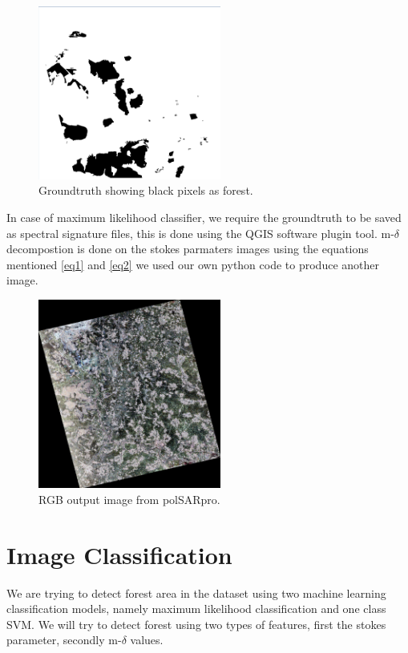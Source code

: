 \begin{figure}[!htbp]
\centering
\includegraphics[width=60mm]{Pictures/data6.png}
\caption{Groundtruth showing black pixels as forest. }
\label{fig3}
\end{figure}

In case of maximum likelihood classifier, we require the groundtruth to be saved as spectral signature files, this is done using the QGIS software plugin tool. m-$\delta$ decompostion is done on the stokes parmaters images using the equations mentioned \ref{eq1} and \ref{eq2} we used our own python code to produce another image.  

\begin{figure}[!htbp]
\centering
\includegraphics[width=60mm]{Pictures/data7.png}
\caption{RGB output image from polSARpro. }
\label{fig4}
\end{figure}



\section{Image Classification}
We are trying to detect forest area in the dataset using two machine learning classification models, namely maximum likelihood classification and one class SVM. We will try to detect forest using two types of features, first the stokes parameter, secondly m-$\delta$ values. 

